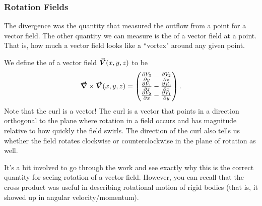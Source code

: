 		        \subsubsection{Rotation Fields}
		        The divergence was the quantity that measured the outflow from a point for a vector field.  The other quantity we can measure is the  of a vector field at a point. That is, how much a vector field looks like a ``vortex" around any given point.

		        We define the  of a vector field $\boldsymbol{\vec{V}}(x,y,z)$ to be
		        \[
		        \boldsymbol{\vec{\nabla}} \times \boldsymbol{\vec{V}}(x,y,z) = \begin{pmatrix} \frac{\partial V_3}{\partial y} - \frac{\partial V_2}{\partial z} \\ \frac{\partial V_1}{\partial z} - \frac{\partial V_3}{\partial x} \\ \frac{\partial V_2}{\partial x} - \frac{\partial V_1}{\partial y} \end{pmatrix}.
		        \]
		        Note that the curl is a vector! The curl is a vector that points in a direction orthogonal to the plane where rotation in a field occurs and has magnitude relative to how quickly the field swirls. The direction of the curl also tells us whether the field rotates clockwise or counterclockwise in the plane of rotation as well.

		        It's a bit involved to go through the work and see exactly why this is the correct quantity for seeing rotation of a vector field.  However, you can recall that the cross product was useful in describing rotational motion of rigid bodies (that is, it showed up in angular velocity/momentum).

